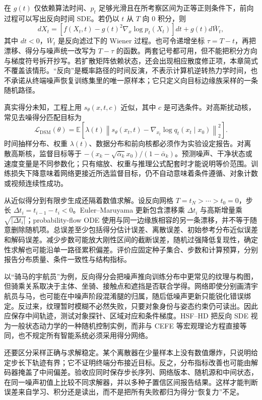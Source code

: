 在 $g(t)$ 仅依赖算法时间、$p_t$ 足够光滑且在所考察区间为正等正则条件下，前向过程可以写出反向时间 SDE。若仍以 $t$ 从 $T$ 向 $0$ 积分，则
\begin{equation}
dX_t=\left[f(X_t,t)-g(t)^2\nabla_x\log p_t(X_t)\right]dt+g(t)d\bar W_t,
\end{equation}
其中 $dt<0$，$\bar W_t$ 是反向滤过下的 Wiener 过程。也可令递增坐标 $\tau=T-t$，再把漂移、得分与噪声统一改写为 $T-\tau$ 的函数。两套记号都可用，但不能把积分方向与梯度符号拆开抄写。若扩散矩阵依赖状态，还会出现相应散度修正项，本章简式不覆盖该情形。“反向”是概率路径的时间反演，不表示计算机逆转热力学时间，也不承诺从终端噪声恢复训练集里的唯一原样本；它只定义向目标边缘族采样的一条随机路径。

真实得分未知，工程上用 $s_\theta(x,t,c)$ 近似，其中 $c$ 是可选条件。对高斯扰动核，常见去噪得分匹配目标为
\begin{equation}
\mathcal L_{\mathrm{DSM}}(\theta)=\mathbb E\left[\lambda(t)
\left\|s_\theta(x_t,t)-\nabla_{x_t}\log q_t(x_t\mid x_0)\right\|_2^2\right].
\end{equation}
时间抽样分布、权重 $\lambda(t)$、数据分布和前向核都必须作为实验设定报告。对离散高斯核，监督目标等于 $-(x_k-\sqrt{\bar\alpha_k}x_0)/(1-\bar\alpha_k)$。预测噪声、干净状态或速度变量是不同参数化；只有缩放、权重与推理公式配套时才能说明等价范围。训练损失下降意味着网络更接近所选监督目标，仍不自动意味着条件遵循、对象计数或视频连续性成功。

从近似得分到有限步生成还隔着数值求解。设反向网格 $T=t_N>\cdots>t_0=0$，步长 $\Delta t_i=t_{i-1}-t_i<0$。Euler--Maruyama 更新包含漂移乘 $\Delta t_i$ 与高斯增量乘 $\sqrt{|\Delta t_i|}$；probability-flow ODE 使用与同一边缘族相容的另一条漂移，并不等于随意删除随机项。总误差至少包括得分估计误差、离散误差、初始参考分布近似误差和解码误差。减少步数可能放大刚性区间的截断误差，随机过强降低复现性，确定性求解也可能沿单一路径累积偏差。评价应固定种子集合、步数和计算预算，分别报告分布质量、条件一致性与结构指标。

以“骑马的宇航员”为例，反向得分会把噪声推向训练分布中更常见的纹理与构图，但骑乘关系取决于主体、坐骑、接触点和遮挡是否联合学得。网络即使分别画清宇航员与马，也可能在中噪声阶段混淆腿的归属，随后低噪声更新只能锐化错误绑定。反过来，纹理暂时模糊不必然失败，只要对象身份与姿态约束仍可读出。因此应保存中间轨迹，测试对象探针、区域对应和条件梯度。HSF--HD 把反向 SDE 视为一般状态动力学的一种随机控制实例，而非与 CEFE 等宏观理论方程直接等同，也不规定所有智能系统必须采用得分网络。

还要区分采样正确与求解稳定。某个离散器在少量样本上没有数值爆炸，只说明给定步长下轨迹有界；它不证明终端分布接近目标。反之，分布指标改善也可能由解码器掩盖了中间偏差。验收应同时保存步长序列、网络版本、随机源和中间状态，在同一噪声初值上比较不同求解器，并以多种子置信区间报告结果。这样才能判断误差来自学习、积分还是读出，而不是把所有失败都归为得分“恢复力”不足。

